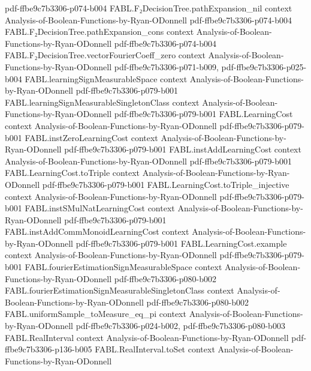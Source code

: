 \begin{theorem}
  {pdf-ffbe9c7b3306-p074-b004}
\proofstep
  {FABL.F₂DecisionTree.pathExpansion_nil}
  {context}
  {Analysis-of-Boolean-Functions-by-Ryan-ODonnell}
  {pdf-ffbe9c7b3306-p074-b004}
\proofstep
  {FABL.F₂DecisionTree.pathExpansion_cons}
  {context}
  {Analysis-of-Boolean-Functions-by-Ryan-ODonnell}
  {pdf-ffbe9c7b3306-p074-b004}
\proofstep
  {FABL.F₂DecisionTree.vectorFourierCoeff_zero}
  {context}
  {Analysis-of-Boolean-Functions-by-Ryan-ODonnell}
  {pdf-ffbe9c7b3306-p071-b009,
    pdf-ffbe9c7b3306-p025-b004}
\proofstep
  {FABL.learningSignMeasurableSpace}
  {context}
  {Analysis-of-Boolean-Functions-by-Ryan-ODonnell}
  {pdf-ffbe9c7b3306-p079-b001}
\proofstep
  {FABL.learningSignMeasurableSingletonClass}
  {context}
  {Analysis-of-Boolean-Functions-by-Ryan-ODonnell}
  {pdf-ffbe9c7b3306-p079-b001}
\proofstep
  {FABL.LearningCost}
  {context}
  {Analysis-of-Boolean-Functions-by-Ryan-ODonnell}
  {pdf-ffbe9c7b3306-p079-b001}
\proofstep
  {FABL.instZeroLearningCost}
  {context}
  {Analysis-of-Boolean-Functions-by-Ryan-ODonnell}
  {pdf-ffbe9c7b3306-p079-b001}
\proofstep
  {FABL.instAddLearningCost}
  {context}
  {Analysis-of-Boolean-Functions-by-Ryan-ODonnell}
  {pdf-ffbe9c7b3306-p079-b001}
\proofstep
  {FABL.LearningCost.toTriple}
  {context}
  {Analysis-of-Boolean-Functions-by-Ryan-ODonnell}
  {pdf-ffbe9c7b3306-p079-b001}
\proofstep
  {FABL.LearningCost.toTriple_injective}
  {context}
  {Analysis-of-Boolean-Functions-by-Ryan-ODonnell}
  {pdf-ffbe9c7b3306-p079-b001}
\proofstep
  {FABL.instSMulNatLearningCost}
  {context}
  {Analysis-of-Boolean-Functions-by-Ryan-ODonnell}
  {pdf-ffbe9c7b3306-p079-b001}
\proofstep
  {FABL.instAddCommMonoidLearningCost}
  {context}
  {Analysis-of-Boolean-Functions-by-Ryan-ODonnell}
  {pdf-ffbe9c7b3306-p079-b001}
\proofstep
  {FABL.LearningCost.example}
  {context}
  {Analysis-of-Boolean-Functions-by-Ryan-ODonnell}
  {pdf-ffbe9c7b3306-p079-b001}
\proofstep
  {FABL.fourierEstimationSignMeasurableSpace}
  {context}
  {Analysis-of-Boolean-Functions-by-Ryan-ODonnell}
  {pdf-ffbe9c7b3306-p080-b002}
\proofstep
  {FABL.fourierEstimationSignMeasurableSingletonClass}
  {context}
  {Analysis-of-Boolean-Functions-by-Ryan-ODonnell}
  {pdf-ffbe9c7b3306-p080-b002}
\proofstep
  {FABL.uniformSample_toMeasure_eq_pi}
  {context}
  {Analysis-of-Boolean-Functions-by-Ryan-ODonnell}
  {pdf-ffbe9c7b3306-p024-b002,
    pdf-ffbe9c7b3306-p080-b003}
\proofstep
  {FABL.RealInterval}
  {context}
  {Analysis-of-Boolean-Functions-by-Ryan-ODonnell}
  {pdf-ffbe9c7b3306-p136-b005}
\proofstep
  {FABL.RealInterval.toSet}
  {context}
  {Analysis-of-Boolean-Functions-by-Ryan-ODonnell}

\end{theorem}
